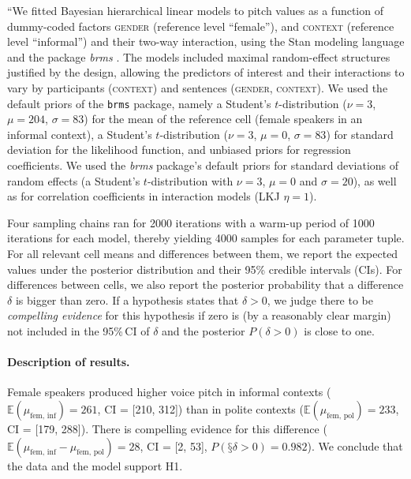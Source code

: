 \documentclass[nobib]{tufte-handout}
\begin{document}
``We fitted Bayesian hierarchical linear models to pitch values as a function of dummy-coded
factors \textsc{gender} (reference level ``female''), and \textsc{context} (reference level
``informal'') and their two-way interaction, using the Stan modeling language
\citep{carpenter2016stan} and the package \emph{brms} \citep{buerkner2016brms}. The models
included maximal random-effect structures justified by the design, allowing the predictors of
interest and their interactions to vary by participants (\textsc{context}) and sentences
(\textsc{gender}, \textsc{context}). We used the default priors of the \texttt{brms} package,
namely a Student's $t$-distribution ($\nu = 3$, $\mu = 204$, $\sigma = 83$) for the mean of the
reference cell (female speakers in an informal context), a Student's $t$-distribution ($\nu =
3$, $\mu = 0$, $\sigma = 83$) for standard deviation for the likelihood function, and unbiased
priors for regression coefficients. We used the \textit{brms} package's default priors for
standard deviations of random effects (a Student's $t$-distribution with $\nu = 3$, $\mu = 0$
and $\sigma = 20$), as well as for correlation coefficients in interaction models (LKJ $\eta =
1$).

Four sampling chains ran for 2000 iterations with a warm-up period of 1000 iterations for each
model, thereby yielding 4000 samples for each parameter tuple. For all relevant cell means and differences
between them, we report the expected values under the posterior distribution and their 95\%
credible intervals (CIs). For differences between cells, we also report the posterior
probability that a difference $\delta$ is bigger than zero. If a hypothesis states that
$\delta >0$, we judge there to be \emph{compelling evidence} for this hypothesis if zero is (by
a reasonably clear margin) not included in the 95\%\,CI of $\delta$ and the posterior $P(\delta
>0)$ is close to one.

\paragraph{Description of results.}  

Female speakers produced higher voice pitch in informal contexts ($\mathbb{E}(\mu_{\text{fem,
    inf}}) = 261$, CI = [210, 312]) than in polite contexts ($\mathbb{E}(\mu_{\text{fem,
    pol}}) = 233$, CI = [179, 288]). There is compelling evidence for this difference
($\mathbb{E}(\mu_{\text{fem, inf}} - \mu_{\text{fem, pol}}) = 28$, CI = [2, 53], $P(§\delta
> 0) = 0.982$). We conclude that the data and the model support H1.
\end{document}

